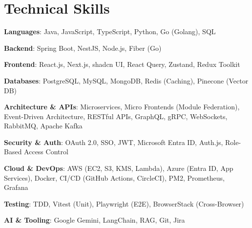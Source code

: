 \section{Technical Skills}
 \resumeSubHeadingListStart
   \item{
     \textbf{Languages}: Java, JavaScript, TypeScript, Python, Go (Golang), SQL
   }
   \vspace{-5pt}
   \item{
     \textbf{Backend}: Spring Boot, NestJS, Node.js, Fiber (Go)
   }
   \vspace{-5pt}
   \item{
     \textbf{Frontend}: React.js, Next.js, shadcn UI, React Query, Zustand, Redux Toolkit
   }
   \vspace{-5pt}
   \item{
     \textbf{Databases}: PostgreSQL, MySQL, MongoDB, Redis (Caching), Pinecone (Vector DB)
   }
   \vspace{-5pt}
   \item{
     \textbf{Architecture \& APIs}: Microservices, Micro Frontends (Module Federation), Event-Driven Architecture, RESTful APIs, GraphQL, gRPC, WebSockets, RabbitMQ, Apache Kafka
   }
   \vspace{-5pt}
   \item{
     \textbf{Security \& Auth}: OAuth 2.0, SSO, JWT, Microsoft Entra ID, Auth.js, Role-Based Access Control
   }
   \vspace{-5pt}
   \item{
     \textbf{Cloud \& DevOps}: AWS (EC2, S3, KMS, Lambda), Azure (Entra ID, App Services), Docker, CI/CD (GitHub Actions, CircleCI), PM2, Prometheus, Grafana
   }
   \vspace{-5pt}
   \item{
     \textbf{Testing}: TDD, Vitest (Unit), Playwright (E2E), BrowserStack (Cross-Browser)
   }
   \vspace{-5pt}
   \item{
     \textbf{AI \& Tooling}: Google Gemini, LangChain, RAG, Git, Jira
   }
 \resumeSubHeadingListEnd
